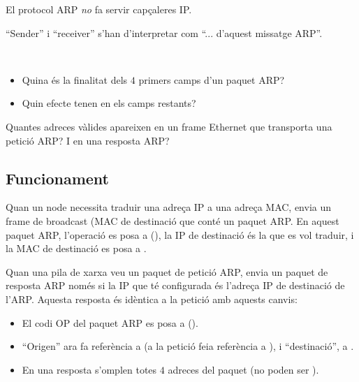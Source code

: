 \begin{remark}
El protocol ARP \textit{no} fa servir capçaleres IP.
\end{remark}
\begin{remark}
``Sender'' i ``receiver'' s'han d'interpretar com ``... d'aquest missatge ARP''.
\end{remark}


\begin{exercise}\ \\[-0.5cm]
\begin{itemize}
\item Quina és la finalitat dels $4$ primers camps d'un paquet ARP?
\item Quin efecte tenen en els camps restants?
\end{itemize}
\end{exercise}

\begin{exercise}
Quantes adreces vàlides apareixen en un frame Ethernet que transporta una petició ARP?
I en una resposta ARP?
\end{exercise}


\subsection{Funcionament}\label{sec:layer3:arp:operation}

Quan un node  necessita traduir una adreça IP a una adreça MAC, envia un frame de broadcast
(MAC de destinació  que conté un paquet ARP. 
En aquest paquet ARP, l'operació es posa a  (),
la IP de destinació és la que es vol traduir, i
la MAC de destinació es posa a .

Quan una pila de xarxa  veu un paquet de petició ARP, 
envia un paquet de resposta ARP només si 
la IP que té configurada és l'adreça IP de destinació de l'ARP.
Aquesta resposta és idèntica a la petició amb aquests canvis:
\begin{itemize}
\item El codi OP del paquet ARP es posa a  ().
\item ``Origen'' ara fa referència a  (a la petició feia referència a ),
  i ``destinació'', a .
\item En una resposta s'omplen totes $4$ adreces del paquet 
  (no poden ser ).
\end{itemize}

